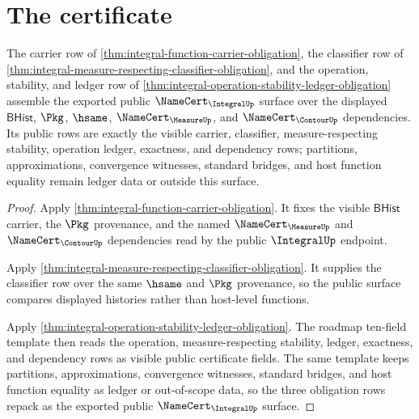 \section{The certificate}
\label{sec:integral-certificate}

\begin{theorem}\label{thm:integral-public-namecert-surface}
The carrier row of \autoref{thm:integral-function-carrier-obligation}, the classifier row of \autoref{thm:integral-measure-respecting-classifier-obligation}, and the operation, stability, and ledger row of \autoref{thm:integral-operation-stability-ledger-obligation} assemble the exported public $\NameCert_{\IntegralUp}$ surface over the displayed $\mathsf{BHist}$, $\Pkg$, $\hsame$, $\NameCert_{\MeasureUp}$, and $\NameCert_{\ContourUp}$ dependencies. Its public rows are exactly the visible carrier, classifier, measure-respecting stability, operation ledger, exactness, and dependency rows; partitions, approximations, convergence witnesses, standard bridges, and host function equality remain ledger data or outside this surface.
\end{theorem}
\begin{proof}
Apply \autoref{thm:integral-function-carrier-obligation}. It fixes the visible $\mathsf{BHist}$ carrier, the $\Pkg$ provenance, and the named $\NameCert_{\MeasureUp}$ and $\NameCert_{\ContourUp}$ dependencies read by the public $\IntegralUp$ endpoint.

Apply \autoref{thm:integral-measure-respecting-classifier-obligation}. It supplies the classifier row over the same $\hsame$ and $\Pkg$ provenance, so the public surface compares displayed histories rather than host-level functions.

Apply \autoref{thm:integral-operation-stability-ledger-obligation}. The roadmap ten-field template then reads the operation, measure-respecting stability, ledger, exactness, and dependency rows as visible public certificate fields. The same template keeps partitions, approximations, convergence witnesses, standard bridges, and host function equality as ledger or out-of-scope data, so the three obligation rows repack as the exported public $\NameCert_{\IntegralUp}$ surface.
\end{proof}

